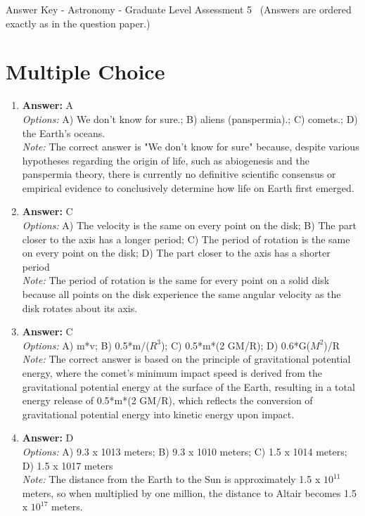 \documentclass[12pt]{article}
\begin{document}
\begin{center}
Answer Key - Astronomy - Graduate Level Assessment 5 \
\small (Answers are ordered exactly as in the question paper.)
\end{center}

\section*{Multiple Choice}
\begin{enumerate}[label=\arabic*.]
\item \textbf{Answer:} A
\\ \textit{Options:} A) We don't know for sure.; B) aliens (panspermia).; C) comets.; D) the Earth's oceans.
\\ \textit{Note:} The correct answer is "We don't know for sure" because, despite various hypotheses regarding the origin of life, such as abiogenesis and the panspermia theory, there is currently no definitive scientific consensus or empirical evidence to conclusively determine how life on Earth first emerged.
\item \textbf{Answer:} C
\\ \textit{Options:} A) The velocity is the same on every point on the disk; B) The part closer to the axis has a longer period; C) The period of rotation is the same on every point on the disk; D) The part closer to the axis has a shorter period
\\ \textit{Note:} The period of rotation is the same for every point on a solid disk because all points on the disk experience the same angular velocity as the disk rotates about its axis.
\item \textbf{Answer:} C
\\ \textit{Options:} A) m*v; B) 0.5*m/($R^3$); C) 0.5*m*(2 GM/R); D) 0.6*G($M^2$)/R
\\ \textit{Note:} The correct answer is based on the principle of gravitational potential energy, where the comet's minimum impact speed is derived from the gravitational potential energy at the surface of the Earth, resulting in a total energy release of 0.5*m*(2 GM/R), which reflects the conversion of gravitational potential energy into kinetic energy upon impact.
\item \textbf{Answer:} D
\\ \textit{Options:} A) 9.3 x 1013 meters; B) 9.3 x 1010 meters; C) 1.5 x 1014 meters; D) 1.5 x 1017 meters
\\ \textit{Note:} The distance from the Earth to the Sun is approximately 1.5 x $10^11$ meters, so when multiplied by one million, the distance to Altair becomes 1.5 x $10^17$ meters.

\end{enumerate}
\end{document}
